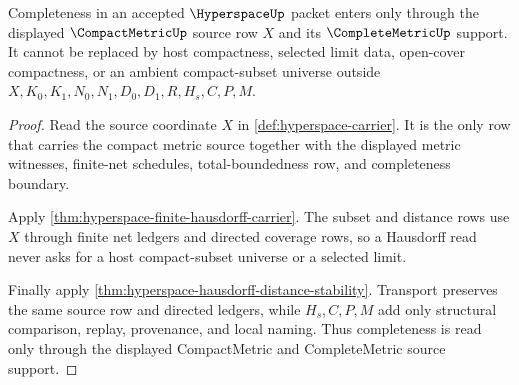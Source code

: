\begin{theorem}
\label{thm:hyperspace-complete-metric-handoff}
Completeness in an accepted $\HyperspaceUp$ packet enters only through the displayed $\CompactMetricUp$ source row $X$ and its $\CompleteMetricUp$ support. It cannot be replaced by host compactness, selected limit data, open-cover compactness, or an ambient compact-subset universe outside $X,K_0,K_1,N_0,N_1,D_0,D_1,R,H_s,C,P,M$.
\end{theorem}
\begin{proof}
Read the source coordinate $X$ in \autoref{def:hyperspace-carrier}. It is the only row that carries the compact metric source together with the displayed metric witnesses, finite-net schedules, total-boundedness row, and completeness boundary.

Apply \autoref{thm:hyperspace-finite-hausdorff-carrier}. The subset and distance rows use $X$ through finite net ledgers and directed coverage rows, so a Hausdorff read never asks for a host compact-subset universe or a selected limit.

Finally apply \autoref{thm:hyperspace-hausdorff-distance-stability}. Transport preserves the same source row and directed ledgers, while $H_s,C,P,M$ add only structural comparison, replay, provenance, and local naming. Thus completeness is read only through the displayed CompactMetric and CompleteMetric source support.
\end{proof}

